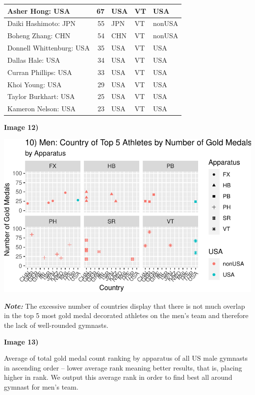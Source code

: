 \documentclass[
  10.5pt,
  letterpaper,
  DIV=11,
  numbers=noendperiod]{scrartcl}
\begin{document}
\begin{table}[H]
\begin{tabular}[t]{l|r|l|l|l}
\hline
Asher Hong: USA & 67 & USA & VT & USA\\
\hline
Daiki Hashimoto: JPN & 55 & JPN & VT & nonUSA\\
\hline
Boheng Zhang: CHN & 54 & CHN & VT & nonUSA\\
\hline
Donnell Whittenburg: USA & 35 & USA & VT & USA\\
\hline
Dallas Hale: USA & 34 & USA & VT & USA\\
\hline
Curran Phillips: USA & 33 & USA & VT & USA\\
\hline
Khoi Young: USA & 29 & USA & VT & USA\\
\hline
Taylor Burkhart: USA & 25 & USA & VT & USA\\
\hline
Kameron Nelson: USA & 23 & USA & VT & USA\\
\hline
\end{tabular}
\end{table}

\textbf{Image 12)}

\includegraphics{Main_files/figure-pdf/top5-decorated-1.pdf}

\textbf{\emph{Note:}} The excessive number of countries display that
there is not much overlap in the top 5 most gold medal decorated
athletes on the men's team and therefore the lack of well-rounded
gymnasts.

\textbf{Image 13)}

Average of total gold medal count ranking by apparatus of all US male
gymnasts in ascending order -- lower average rank meaning better
results, that is, placing higher in rank. We output this average rank in
order to find best all around gymnast for men's team.
\end{document}

